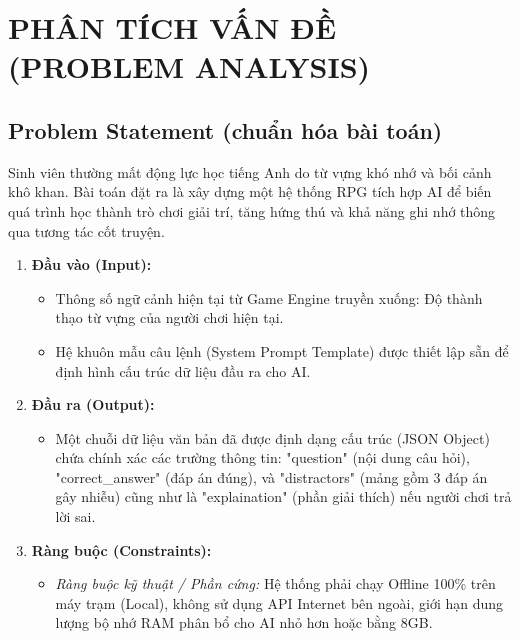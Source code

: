 \section{PHÂN TÍCH VẤN ĐỀ (PROBLEM ANALYSIS)}

\subsection{Problem Statement (chuẩn hóa bài toán)}
Sinh viên thường mất động lực học tiếng Anh do từ vựng khó nhớ và bối cảnh khô khan. Bài toán đặt ra là xây dựng một hệ thống RPG tích hợp AI để biến quá trình học thành trò chơi giải trí, tăng hứng thú và khả năng ghi nhớ thông qua tương tác cốt truyện.
\begin{enumerate}
	\item \textbf{Đầu vào (Input):} 
	\begin{itemize}
		\item Thông số ngữ cảnh hiện tại từ Game Engine truyền xuống: Độ thành thạo từ vựng của người chơi hiện tại.
		\item Hệ khuôn mẫu câu lệnh (System Prompt Template) được thiết lập sẵn để định hình cấu trúc dữ liệu đầu ra cho AI.
	\end{itemize}
	\item \textbf{Đầu ra (Output):} 
	\begin{itemize}
		\item Một chuỗi dữ liệu văn bản đã được định dạng cấu trúc (JSON Object) chứa chính xác các trường thông tin: "question" (nội dung câu hỏi), "correct\_answer" (đáp án đúng), và "distractors" (mảng gồm 3 đáp án gây nhiễu) cũng như là "explaination" (phần giải thích) nếu người chơi trả lời sai.
	\end{itemize}
		\item \textbf{Ràng buộc (Constraints):}
	\begin{itemize}
		\item \textit{Ràng buộc kỹ thuật / Phần cứng:} Hệ thống phải chạy Offline 100\% trên máy trạm (Local), không sử dụng API Internet bên ngoài, giới hạn dung lượng bộ nhớ RAM phân bổ cho AI nhỏ hơn hoặc bằng 8GB.
	\end{itemize}
\end{enumerate}

